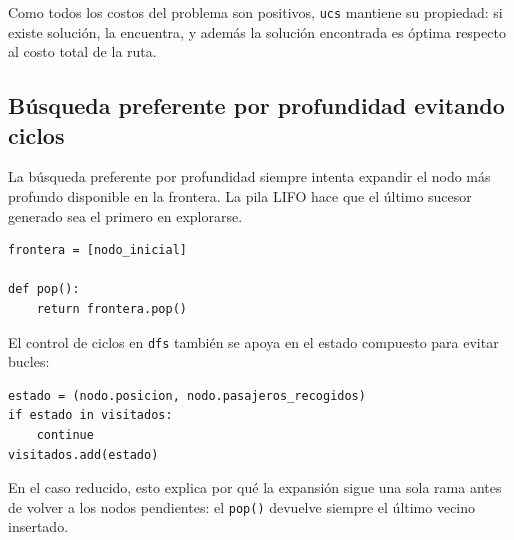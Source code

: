 \documentclass[12pt,a4paper]{article}
\begin{document}
Como todos los costos del problema son positivos, \texttt{ucs} mantiene su propiedad: si existe solución, la encuentra, y además la solución encontrada es óptima respecto al costo total de la ruta.
\subsection{Búsqueda preferente por profundidad evitando ciclos}
La búsqueda preferente por profundidad siempre intenta expandir el nodo más profundo disponible en la frontera. La pila LIFO hace que el último sucesor generado sea el primero en explorarse.

\begin{lstlisting}[style=pythonstyle,caption={Implementación de DFS (frontera LIFO)}]
frontera = [nodo_inicial]

def pop():
    return frontera.pop()
\end{lstlisting}

El control de ciclos en \texttt{dfs} también se apoya en el estado compuesto para evitar bucles:

\begin{lstlisting}[style=pythonstyle,caption={Control de ciclos en DFS}]
estado = (nodo.posicion, nodo.pasajeros_recogidos)
if estado in visitados:
    continue
visitados.add(estado)
\end{lstlisting}

En el caso reducido, esto explica por qué la expansión sigue una sola rama antes de volver a los nodos pendientes: el \texttt{pop()} devuelve siempre el último vecino insertado.
\end{document}
